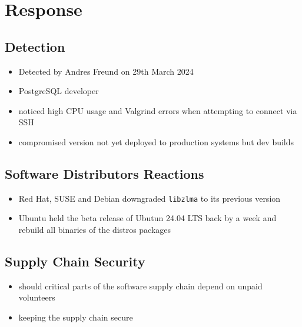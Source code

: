 \section{Response}

\subsection{Detection}

\begin{itemize}
    \item Detected by Andres Freund on 29th March 2024
    \item PostgreSQL developer
    \item noticed high CPU usage and Valgrind errors when attempting to connect via SSH
    \item compromised version not yet deployed to production systems but dev builds
\end{itemize}


\subsection{Software Distributors Reactions}

\begin{itemize}
    \item Red Hat, SUSE and Debian downgraded \texttt{libzlma} to its previous version
    \item Ubuntu held the beta release of Ubutun 24.04 LTS back by a week and
        rebuild all binaries of the distros packages
\end{itemize}

\subsection{Supply Chain Security}

\begin{itemize}
    \item should critical parts of the software supply chain depend on unpaid volunteers
    \item keeping the supply chain secure
\end{itemize}
